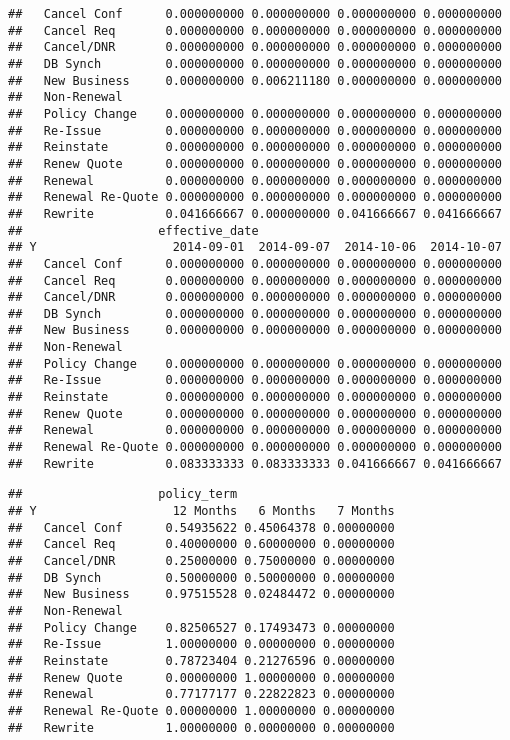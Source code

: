 \documentclass[]{article}
\begin{document}
\begin{verbatim}
##   Cancel Conf      0.000000000 0.000000000 0.000000000 0.000000000
##   Cancel Req       0.000000000 0.000000000 0.000000000 0.000000000
##   Cancel/DNR       0.000000000 0.000000000 0.000000000 0.000000000
##   DB Synch         0.000000000 0.000000000 0.000000000 0.000000000
##   New Business     0.000000000 0.006211180 0.000000000 0.000000000
##   Non-Renewal                                                     
##   Policy Change    0.000000000 0.000000000 0.000000000 0.000000000
##   Re-Issue         0.000000000 0.000000000 0.000000000 0.000000000
##   Reinstate        0.000000000 0.000000000 0.000000000 0.000000000
##   Renew Quote      0.000000000 0.000000000 0.000000000 0.000000000
##   Renewal          0.000000000 0.000000000 0.000000000 0.000000000
##   Renewal Re-Quote 0.000000000 0.000000000 0.000000000 0.000000000
##   Rewrite          0.041666667 0.000000000 0.041666667 0.041666667
##                   effective_date
## Y                   2014-09-01  2014-09-07  2014-10-06  2014-10-07
##   Cancel Conf      0.000000000 0.000000000 0.000000000 0.000000000
##   Cancel Req       0.000000000 0.000000000 0.000000000 0.000000000
##   Cancel/DNR       0.000000000 0.000000000 0.000000000 0.000000000
##   DB Synch         0.000000000 0.000000000 0.000000000 0.000000000
##   New Business     0.000000000 0.000000000 0.000000000 0.000000000
##   Non-Renewal                                                     
##   Policy Change    0.000000000 0.000000000 0.000000000 0.000000000
##   Re-Issue         0.000000000 0.000000000 0.000000000 0.000000000
##   Reinstate        0.000000000 0.000000000 0.000000000 0.000000000
##   Renew Quote      0.000000000 0.000000000 0.000000000 0.000000000
##   Renewal          0.000000000 0.000000000 0.000000000 0.000000000
##   Renewal Re-Quote 0.000000000 0.000000000 0.000000000 0.000000000
##   Rewrite          0.083333333 0.083333333 0.041666667 0.041666667
\end{verbatim}

\begin{verbatim}
##                   policy_term
## Y                   12 Months   6 Months   7 Months
##   Cancel Conf      0.54935622 0.45064378 0.00000000
##   Cancel Req       0.40000000 0.60000000 0.00000000
##   Cancel/DNR       0.25000000 0.75000000 0.00000000
##   DB Synch         0.50000000 0.50000000 0.00000000
##   New Business     0.97515528 0.02484472 0.00000000
##   Non-Renewal                                      
##   Policy Change    0.82506527 0.17493473 0.00000000
##   Re-Issue         1.00000000 0.00000000 0.00000000
##   Reinstate        0.78723404 0.21276596 0.00000000
##   Renew Quote      0.00000000 1.00000000 0.00000000
##   Renewal          0.77177177 0.22822823 0.00000000
##   Renewal Re-Quote 0.00000000 1.00000000 0.00000000
##   Rewrite          1.00000000 0.00000000 0.00000000
\end{verbatim}
\end{document}
